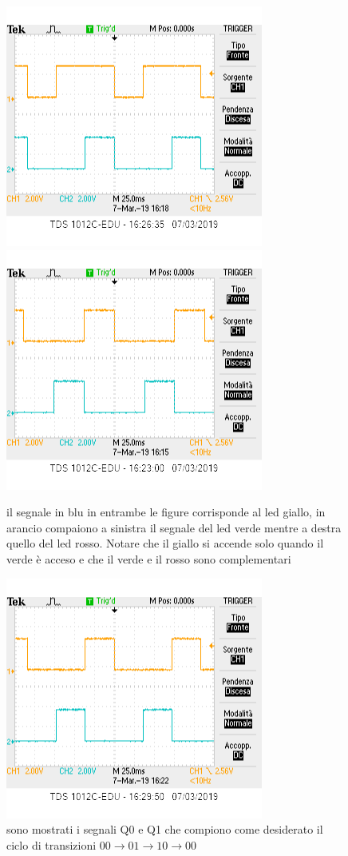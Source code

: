 \documentclass[12pt,a4paper]{article}
\begin{document}
\begin{figure}
	\centering
	\includegraphics[scale=0.8]{yellowandgreen.png}
	\includegraphics[scale=0.8]{yellowandred.png}
	
	\caption{il segnale in blu in entrambe  le figure corrisponde al led giallo, in arancio compaiono a sinistra  il segnale del led verde mentre a destra quello del led rosso. Notare che il giallo si accende solo quando il verde è  acceso e che il verde e il rosso sono complementari}
	
\end{figure}
\begin{figure}
\centering

\includegraphics[scale=0.8]{Q1andQ2}
\caption{sono mostrati i segnali Q0 e Q1 che compiono come desiderato il ciclo di  transizioni $00\to 01 \to 10 \to 00$}
\end{figure}
\end{document}

